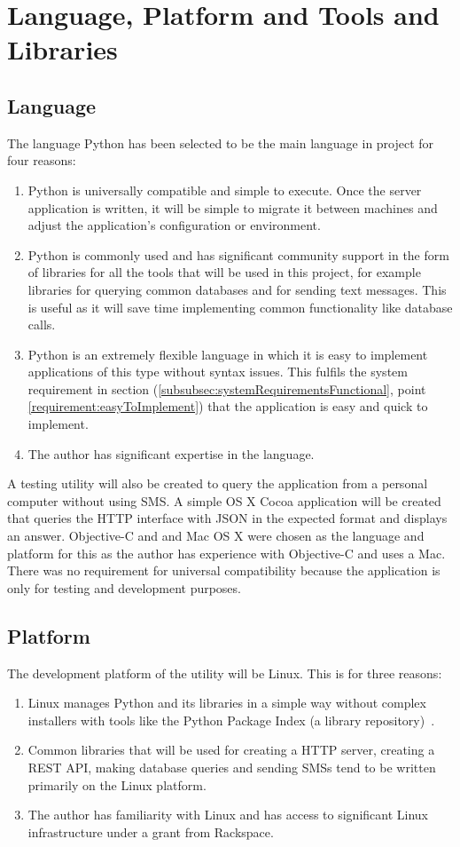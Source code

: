 \documentclass[authoryearcitations]{UoYCSproject}
\begin{document}
\section{Language, Platform and Tools and Libraries}
\subsection{Language}
\label{section:designLanguage}
The language Python has been selected to be the main language in project for four reasons:
\begin{enumerate}
  \item Python is universally compatible and simple to execute.  Once the server application is written, it will be simple to migrate it between machines and adjust the application's configuration or environment.
  \item Python is commonly used and has significant community support in the form of libraries for all the tools that will be used in this project, for example libraries for querying common databases and for sending text messages.  This is useful as it will save time implementing common functionality like database calls.
  \item Python is an extremely flexible language in which it is easy to implement applications of this type without syntax issues.  This fulfils the system requirement in section (\ref{subsubsec:systemRequirementsFunctional}, point \ref{requirement:easyToImplement}) that the application is easy and quick to implement.
  \item The author has significant expertise in the language.
\end{enumerate}

A testing utility will also be created to query the application from a personal computer without using SMS.  A simple OS X Cocoa application will be created that queries the HTTP interface with JSON in the expected format and displays an answer.  Objective-C and and Mac OS X were chosen as the language and platform for this as the author has experience with Objective-C and uses a Mac.  There was no requirement for universal compatibility because the application is only for testing and development purposes.

\subsection{Platform}
The development platform of the utility will be Linux.  This is for three reasons:
\begin{enumerate}
  \item Linux manages Python and its libraries in a simple way without complex installers with tools like the Python Package Index (a library repository)~\cite{pypi}.
  \item Common libraries that will be used for creating a HTTP server, creating a REST API, making database queries and sending SMSs tend to be written primarily on the Linux platform.
  \item The author has familiarity with Linux and has access to significant Linux infrastructure under a grant from Rackspace.
\end{enumerate}
\end{document}
